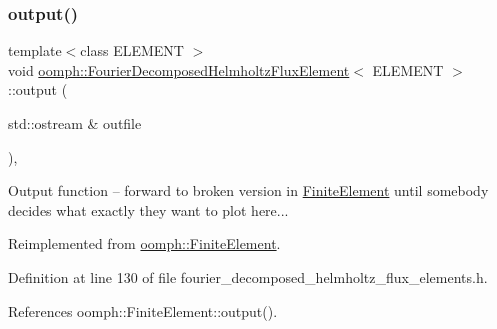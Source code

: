 \mbox{\label{classoomph_1_1FourierDecomposedHelmholtzFluxElement_ad16dd86d02fc30d44ae9e25ddd6d1964}} 
\subsubsection{\texorpdfstring{output()}{output()}\hspace{0.1cm}{\footnotesize\ttfamily [1/4]}}
{\footnotesize\ttfamily template$<$class E\+L\+E\+M\+E\+NT $>$ \\
void \hyperlink{classoomph_1_1FourierDecomposedHelmholtzFluxElement}{oomph\+::\+Fourier\+Decomposed\+Helmholtz\+Flux\+Element}$<$ E\+L\+E\+M\+E\+NT $>$\+::output (\begin{DoxyParamCaption}\item[{std\+::ostream \&}]{outfile }\end{DoxyParamCaption})\hspace{0.3cm}{\ttfamily [inline]}, {\ttfamily [virtual]}}

Output function -- forward to broken version in \hyperlink{classoomph_1_1FiniteElement}{Finite\+Element} until somebody decides what exactly they want to plot here... 

Reimplemented from \hyperlink{classoomph_1_1FiniteElement_a2ad98a3d2ef4999f1bef62c0ff13f2a7}{oomph\+::\+Finite\+Element}.



Definition at line 130 of file fourier\+\_\+decomposed\+\_\+helmholtz\+\_\+flux\+\_\+elements.\+h.



References oomph\+::\+Finite\+Element\+::output().

\mbox{\label{classoomph_1_1FourierDecomposedHelmholtzFluxElement_ab1840440fdc52e7e7f515cb4d57d5919}} 
